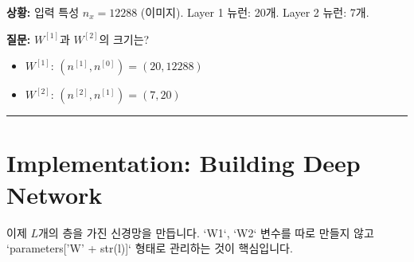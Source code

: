 \documentclass[11pt,a4paper]{book}
\theoremstyle{definition}
\begin{document}
\begin{examplebox}[title={차원 계산 퀴즈}]
\textbf{상황:}
입력 특성 $n_x = 12288$ (이미지).
Layer 1 뉴런: 20개.
Layer 2 뉴런: 7개.

\textbf{질문:} $W^{[1]}$과 $W^{[2]}$의 크기는?
\begin{itemize}
    \item $W^{[1]}$: $(n^{[1]}, n^{[0]}) = (20, 12288)$
    \item $W^{[2]}$: $(n^{[2]}, n^{[1]}) = (7, 20)$
\end{itemize}
\end{examplebox}

\vspace{0.5cm}\hrule\vspace{0.5cm}

\section{Implementation: Building Deep Network}

이제 $L$개의 층을 가진 신경망을 만듭니다. `W1`, `W2` 변수를 따로 만들지 않고 `parameters['W' + str(l)]` 형태로 관리하는 것이 핵심입니다.
\end{document}
